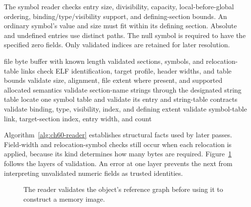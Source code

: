 The symbol reader checks entry size, divisibility, capacity, local-before-global ordering, binding/type/visibility support, and defining-section bounds.
An ordinary symbol's value and size must fit within its defining section.
Absolute and undefined entries use distinct paths.
The null symbol is required to have the specified zero fields.
Only validated indices are retained for later resolution.

\begin{algorithm}[htbp]
\caption{Validate an object before exposing its references to layout or relocation.}
\label{alg:ch60-reader}
\begin{pseudocode}
\Require file byte buffer with known length
\Ensure validated sections, symbols, and relocation-table links
\State check ELF identification, target profile, header widths, and table bounds
  \State validate size, alignment, file extent where present, and supported allocated semantics
\EndFor
\State validate section-name strings through the designated string table
\State locate one symbol table and validate its entry and string-table contracts
  \State validate binding, type, visibility, index, and defining extent
\EndFor
{}
  \State validate symbol-table link, target-section index, entry width, and count
\EndFor
\end{pseudocode}
\end{algorithm}

Algorithm~\ref{alg:ch60-reader} establishes structural facts used by later passes.
Field-width and relocation-symbol checks still occur when each relocation is applied, because its kind determines how many bytes are required.
Figure~\ref{fig:ch60-validation} follows the layers of validation.
An error at one layer prevents the next from interpreting unvalidated numeric fields as trusted identities.

\begin{figure}[htbp]
\centering
{}
\caption{The reader validates the object's reference graph before using it to construct a memory image.}
\label{fig:ch60-validation}
\end{figure}

